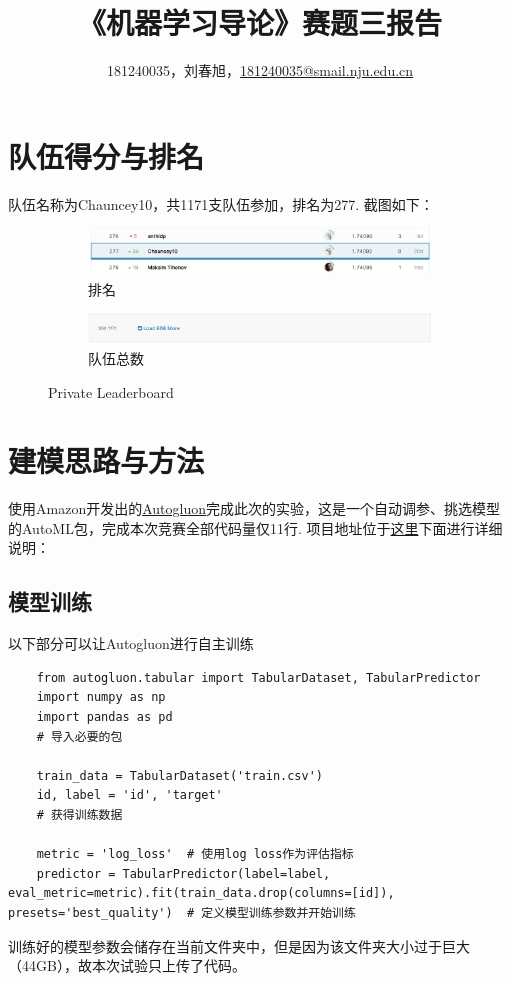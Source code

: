 \documentclass[a4paper,UTF8]{article}
\theoremstyle{definition}
\begin{document}
\title{\textbf{《机器学习导论》赛题三报告}}
\author{181240035，刘春旭，\href{mailto:181240035@smail.nju.edu.cn}{181240035@smail.nju.edu.cn}}
\maketitle

\section{队伍得分与排名}
队伍名称为Chauncey10，共1171支队伍参加，排名为277.
截图如下：
\begin{figure}[h]
  \centering
  \begin{subfigure}[b]{0.45\textwidth}
      \centering
      \includegraphics[width=\textwidth]{rank.png}
      \caption{排名}
  \end{subfigure}
  \hfill
  \begin{subfigure}[b]{0.45\textwidth}
      \centering
      \includegraphics[width=\textwidth]{total.png}
      \caption{队伍总数}
  \end{subfigure}
  \caption{Private Leaderboard}
  \label{demo}
\end{figure}

\section{建模思路与方法}
使用Amazon开发出的\href{https://auto.gluon.ai/stable/index.html}{Autogluon}完成此次的实验，这是一个自动调参、挑选模型的AutoML包，完成本次竞赛全部代码量仅11行. 项目地址位于\href{https://github.com/lcxrocks/Kaggele_2021_Jun}{这里}下面进行详细说明：
\subsection{模型训练}
以下部分可以让Autogluon进行自主训练
\begin{lstlisting}
    from autogluon.tabular import TabularDataset, TabularPredictor
    import numpy as np
    import pandas as pd
    # 导入必要的包
    
    train_data = TabularDataset('train.csv')
    id, label = 'id', 'target'
    # 获得训练数据
    
    metric = 'log_loss'  # 使用log loss作为评估指标
    predictor = TabularPredictor(label=label, eval_metric=metric).fit(train_data.drop(columns=[id]),  presets='best_quality')  # 定义模型训练参数并开始训练
\end{lstlisting}
训练好的模型参数会储存在当前文件夹中，但是因为该文件夹大小过于巨大（44GB），故本次试验只上传了代码。
\end{document}

